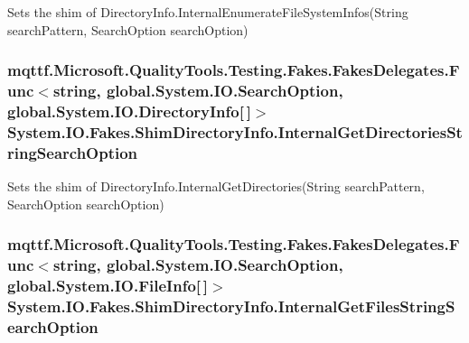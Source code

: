Sets the shim of Directory\-Info.\-Internal\-Enumerate\-File\-System\-Infos(\-String search\-Pattern, Search\-Option search\-Option)

\hypertarget{class_system_1_1_i_o_1_1_fakes_1_1_shim_directory_info_adc82f640c6db84b2197d780d2ecdb04e}{
\subsubsection[{Internal\-Get\-Directories\-String\-Search\-Option}]{\setlength{\rightskip}{0pt plus 5cm}mqttf.\-Microsoft.\-Quality\-Tools.\-Testing.\-Fakes.\-Fakes\-Delegates.\-Func$<$string, global.\-System.\-I\-O.\-Search\-Option, global.\-System.\-I\-O.\-Directory\-Info\mbox{[}$\,$\mbox{]}$>$ System.\-I\-O.\-Fakes.\-Shim\-Directory\-Info.\-Internal\-Get\-Directories\-String\-Search\-Option\hspace{0.3cm}{\ttfamily [set]}}}\label{class_system_1_1_i_o_1_1_fakes_1_1_shim_directory_info_adc82f640c6db84b2197d780d2ecdb04e}


Sets the shim of Directory\-Info.\-Internal\-Get\-Directories(\-String search\-Pattern, Search\-Option search\-Option)

\hypertarget{class_system_1_1_i_o_1_1_fakes_1_1_shim_directory_info_aed1245d2304da11f599aae1898507543}{
\subsubsection[{Internal\-Get\-Files\-String\-Search\-Option}]{\setlength{\rightskip}{0pt plus 5cm}mqttf.\-Microsoft.\-Quality\-Tools.\-Testing.\-Fakes.\-Fakes\-Delegates.\-Func$<$string, global.\-System.\-I\-O.\-Search\-Option, global.\-System.\-I\-O.\-File\-Info\mbox{[}$\,$\mbox{]}$>$ System.\-I\-O.\-Fakes.\-Shim\-Directory\-Info.\-Internal\-Get\-Files\-String\-Search\-Option\hspace{0.3cm}{\ttfamily [set]}}}\label{class_system_1_1_i_o_1_1_fakes_1_1_shim_directory_info_aed1245d2304da11f599aae1898507543}


